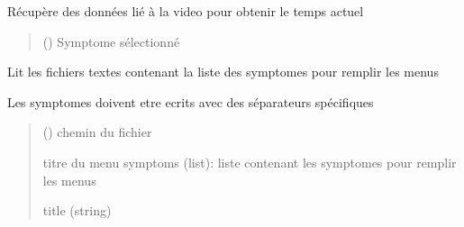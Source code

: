 \documentclass[letterpaper,10pt,english]{sphinxmanual}
\begin{document}
\begin{fulllineitems}

\begin{fulllineitems}
\label{\detokenize{general_interface:general_interface_V9.Menu_symptomes.on_select_subj}}
\pysigstartsignatures
{}
\pysigstopsignatures
\sphinxAtStartPar
Récupère des données lié à la video pour obtenir le temps actuel
\begin{quote}\begin{description}
\sphinxAtStartPar
{} () \textendash{} Symptome sélectionné

\end{description}\end{quote}

\end{fulllineitems}


\begin{fulllineitems}
\label{\detokenize{general_interface:general_interface_V9.Menu_symptomes.read_symptoms_from_file}}
\pysigstartsignatures
{}
\pysigstopsignatures
\sphinxAtStartPar
Lit les fichiers textes contenant la liste des symptomes pour remplir les menus

\sphinxAtStartPar
Les symptomes doivent etre ecrits avec des séparateurs spécifiques
\begin{quote}\begin{description}
\sphinxAtStartPar
{} () \textendash{} chemin du fichier

\sphinxAtStartPar
titre du menu
symptoms (list): liste contenant les symptomes pour remplir les menus

\sphinxAtStartPar
title (string)

\end{description}\end{quote}

\end{fulllineitems}


\end{fulllineitems}
\end{document}
